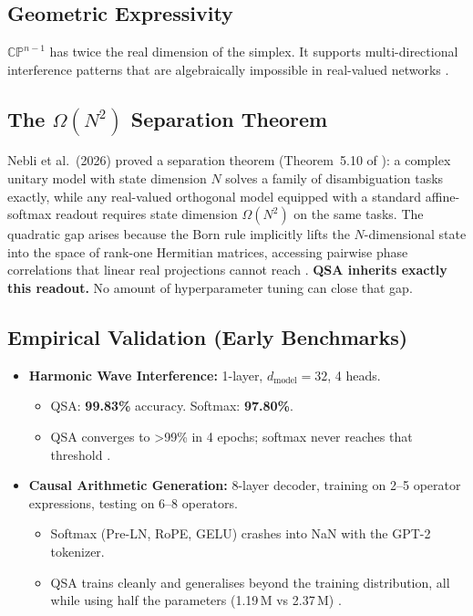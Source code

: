 \documentclass[11pt]{article}
\begin{document}
\subsection{Geometric Expressivity}

\(\mathbb{C}\mathbb{P}^{n-1}\) has twice the real dimension of the simplex. It supports multi-directional interference patterns that are algebraically impossible in real-valued networks \cite{prism2025}.

\subsection{The \(\Omega(N^2)\) Separation Theorem}

Nebli et al.\ (2026) proved a separation theorem (Theorem~5.10 of \cite{nebli2026}): a complex unitary model with state dimension \(N\) solves a family of disambiguation tasks exactly, while any real-valued orthogonal model equipped with a standard affine-softmax readout requires state dimension \(\Omega(N^2)\) on the same tasks. The quadratic gap arises because the Born rule implicitly lifts the \(N\)-dimensional state into the space of rank-one Hermitian matrices, accessing pairwise phase correlations that linear real projections cannot reach \cite{nebli2026}. \textbf{QSA inherits exactly this readout.} No amount of hyperparameter tuning can close that gap.

\subsection{Empirical Validation (Early Benchmarks)}

\begin{itemize}
    \item \textbf{Harmonic Wave Interference:} 1-layer, \(d_{\text{model}}=32\), 4 heads.
    \begin{itemize}
        \item QSA: \textbf{99.83\%} accuracy. Softmax: \textbf{97.80\%}.
        \item QSA converges to >99\% in 4 epochs; softmax never reaches that threshold \cite{yaka2026qsa}.
    \end{itemize}
    \item \textbf{Causal Arithmetic Generation:} 8-layer decoder, training on 2--5 operator expressions, testing on 6--8 operators.
    \begin{itemize}
        \item Softmax (Pre-LN, RoPE, GELU) crashes into NaN with the GPT-2 tokenizer.
        \item QSA trains cleanly and generalises beyond the training distribution, all while using half the parameters (1.19\,M vs 2.37\,M) \cite{qisa2026, yaka2026qsa}.
    \end{itemize}
\end{itemize}
\end{document}
